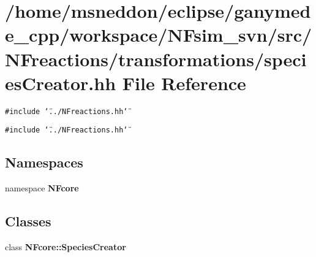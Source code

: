 \section{/home/msneddon/eclipse/ganymede\_\-cpp/workspace/NFsim\_\-svn/src/NFreactions/transformations/speciesCreator.hh File Reference}
\label{speciesCreator_8hh}


{\tt \#include \char`\"{}../NFreactions.hh\char`\"{}}\par
{\tt \#include \char`\"{}../NFreactions.hh\char`\"{}}\par
\subsection*{Namespaces}
\begin{CompactItemize}
\item 
namespace {\bf NFcore}
\end{CompactItemize}
\subsection*{Classes}
\begin{CompactItemize}
\item 
class {\bf NFcore::SpeciesCreator}
\end{CompactItemize}
